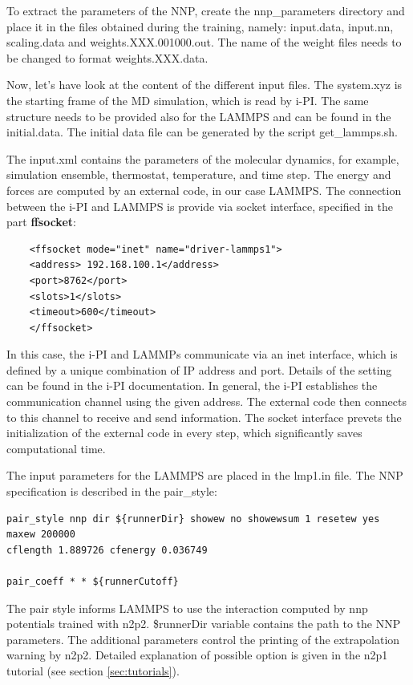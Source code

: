 \documentclass[12pt]{article}
\begin{document}
To extract the parameters of the NNP, create the nnp\_parameters directory and place it in the files obtained during the training, namely: input.data, input.nn, scaling.data and weights.XXX.001000.out. The name of the weight files needs to be changed to format weights.XXX.data. 

Now, let's have look at the content of the different input files. The system.xyz is the starting frame of the MD simulation, which is read by i-PI. The same structure needs to be provided also for the LAMMPS and can be found in the initial.data. The initial data file can be generated by the script get\_lammps.sh.

The input.xml contains the parameters of the molecular dynamics, for example, simulation ensemble, thermostat, temperature, and time step. The energy and forces are computed by an external code, in our case LAMMPS. The connection between the i-PI and LAMMPS is provide via socket interface, specified in the part \textbf{ffsocket}:

\begin{verbatim}
    <ffsocket mode="inet" name="driver-lammps1">
    <address> 192.168.100.1</address>
    <port>8762</port>
    <slots>1</slots>
    <timeout>600</timeout>
    </ffsocket>
\end{verbatim}

In this case, the i-PI and LAMMPs communicate via an inet interface, which is defined by a unique combination of IP address and port. Details of the setting can be found in the i-PI documentation. In general, the i-PI establishes the communication channel using the given address. The external code then connects to this channel to receive and send information. The socket interface prevets the initialization of the external code in every step, which significantly saves computational time. 

The input parameters for the LAMMPS are placed in the lmp1.in file. The NNP specification is described in the pair\_style:

\begin{verbatim}
pair_style nnp dir ${runnerDir} showew no showewsum 1 resetew yes maxew 200000
cflength 1.889726 cfenergy 0.036749

pair_coeff * * ${runnerCutoff}
\end{verbatim}

The pair style informs LAMMPS to use the interaction computed by nnp potentials trained with n2p2. \${runnerDir} variable contains the path to the NNP parameters. The additional parameters control the printing of the extrapolation warning by n2p2. Detailed explanation of possible option is given in the n2p1 tutorial (see section \ref{sec:tutorials}).
\end{document}
